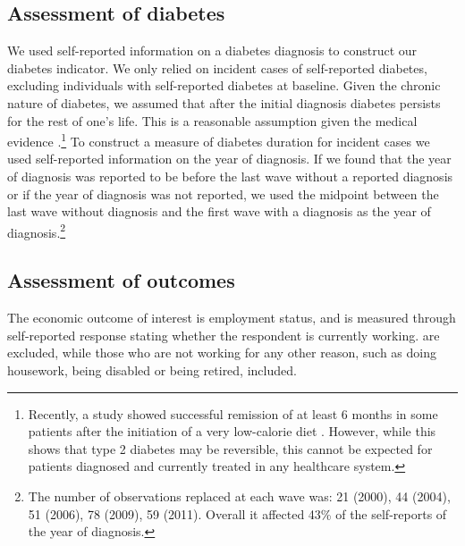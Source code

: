 \subsection{Assessment of diabetes}

We used self-reported information on a diabetes diagnosis to construct our diabetes indicator. We only relied on incident cases of self-reported diabetes, excluding individuals with self-reported diabetes at baseline. Given the chronic nature of diabetes, we assumed that after the initial diagnosis diabetes persists for the rest of one's life. This is a reasonable assumption given the medical evidence \parencite{Steven2016}.\footnote{Recently, a study showed successful remission of at least 6 months in some patients after the initiation of a very low-calorie diet \parencite{Steven2016}. However, while this shows that type 2 diabetes may be reversible, this cannot be expected for patients diagnosed and currently treated in any healthcare system.} To construct a measure of diabetes duration for incident cases we used self-reported information on the year of diagnosis. If we found that the year of diagnosis was reported to be before the last wave without a reported diagnosis or if the year of diagnosis was not reported, we used the midpoint between the last wave without diagnosis and the first wave with a diagnosis as the year of diagnosis.\footnote{The number of observations replaced at each wave was: 21 (2000), 44 (2004), 51  (2006), 78 (2009), 59 (2011). Overall it affected 43\% of the self-reports of the year of diagnosis.}

\subsection{Assessment of outcomes}

The economic outcome of interest is employment status, and is measured through self-reported response stating whether the respondent is currently working. \DIFdelbegin {}\DIFdelend \DIFaddbegin {}\DIFaddend are excluded, while those who are not working for any other reason, such as doing housework, being disabled or being retired, \DIFdelbegin {}\DIFdelend \DIFaddbegin {}\DIFaddend included. 

